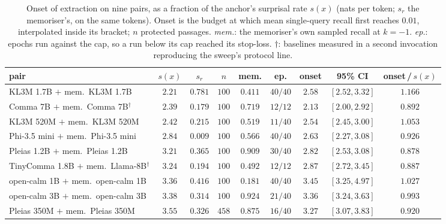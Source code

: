 \begin{table}[h]
\centering\footnotesize
\caption{Onset of extraction on nine pairs, as a fraction of the anchor's surprisal rate $s(x)$ (nats per
token; $s_r$ the memoriser's, on the same tokens). Onset is the budget at which mean single-query recall
first reaches $0.01$, interpolated inside its bracket; $n$ protected passages. \emph{mem.}: the memoriser's
own sampled recall at $k=-1$. \emph{ep.}: epochs run against the cap, so a run below its cap reached its
stop-loss. $\dagger$: baselines measured in a second invocation reproducing the sweep's protocol line.}
\label{tab:onset}
\setlength{\tabcolsep}{2pt}
\begin{tabular}{@{}lcccccccc@{}}
\toprule
pair & $s(x)$ & $s_r$ & $n$ & mem. & ep. & onset & 95\% CI & onset\,/\,$s(x)$ \\
\midrule
KL3M 1.7B $+$ mem.\ KL3M 1.7B       & $2.21$ & $0.781$ & $100$ & $0.411$ & $40/40$ & $2.58$ & $[2.52, 3.32]$ & $1.166$ \\
Comma 7B $+$ mem.\ Comma 7B$^{\dagger}$ & $2.39$ & $0.179$ & $100$ & $0.719$ & $12/12$ & $2.13$ & $[2.00, 2.92]$ & $0.892$ \\
KL3M 520M $+$ mem.\ KL3M 520M       & $2.42$ & $0.215$ & $100$ & $0.519$ & $11/40$ & $2.54$ & $[2.45, 3.00]$ & $1.053$ \\
Phi-3.5 mini $+$ mem.\ Phi-3.5 mini & $2.84$ & $0.009$ & $100$ & $0.566$ & $40/40$ & $2.63$ & $[2.27, 3.08]$ & $0.926$ \\
Pleias 1.2B $+$ mem.\ Pleias 1.2B   & $3.21$ & $0.365$ & $100$ & $0.909$ & $30/40$ & $2.82$ & $[2.53, 3.08]$ & $0.878$ \\
TinyComma 1.8B $+$ mem.\ Llama-8B$^{\dagger}$ & $3.24$ & $0.194$ & $100$ & $0.492$ & $12/12$ & $2.87$ & $[2.72, 3.45]$ & $0.887$ \\
open-calm 1B $+$ mem.\ open-calm 1B & $3.36$ & $0.416$ & $100$ & $0.181$ & $40/40$ & $3.45$ & $[3.25, 4.97]$ & $1.027$ \\
open-calm 3B $+$ mem.\ open-calm 3B & $3.38$ & $0.314$ & $100$ & $0.924$ & $21/40$ & $3.36$ & $[3.24, 3.63]$ & $0.993$ \\
Pleias 350M $+$ mem.\ Pleias 350M   & $3.55$ & $0.326$ & $458$ & $0.875$ & $16/40$ & $3.27$ & $[3.07, 3.83]$ & $0.920$ \\
\bottomrule
\end{tabular}
\end{table}

